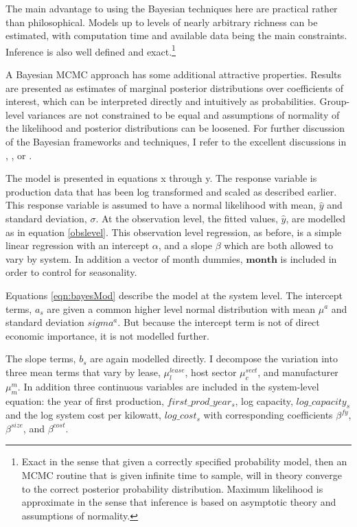 \documentclass[12pt]{article}
\begin{document}
The main advantage to using the Bayesian techniques here are practical rather than philosophical. Models up to levels of nearly arbitrary richness can be estimated, with computation time and available data being the main constraints. Inference is also well defined and exact.\footnote{Exact in the sense that given a correctly specified probability model, then an MCMC routine that is given infinite time to sample, will in theory converge to the correct posterior probability distribution. Maximum likelihood is approximate in the sense that inference is based on asymptotic theory and assumptions of normality.}

A Bayesian MCMC approach has some additional attractive properties. Results are presented as estimates of marginal posterior distributions over coefficients of interest, which can be interpreted directly and intuitively as probabilities. Group-level variances are not constrained to be equal and assumptions of normality of the likelihood and posterior distributions can be loosened. For further discussion of the Bayesian frameworks and techniques, I refer to the excellent discussions in \citet{gelman_bayesian_2013}, \citet{kruschke_doing_2014}, or \citet{mcelreath_statistical_2015}.

The model is presented in equations x through y. The response variable is production data that has been log transformed and scaled as described earlier. This response variable is assumed to have a normal likelihood with mean, $\hat{y}$ and standard deviation, $\sigma$. At the observation level, the fitted values, $\hat{y}$, are modelled as in equation \ref{obslevel}. This observation level regression, as before, is a simple linear regression with an intercept $\alpha$, and a slope $\beta$ which are both allowed to vary by system. In addition a vector of month dummies, $\mathbf{month}$ is included in order to control for seasonality.

Equations \ref{eqn:bayesMod} describe the model at the system level. The intercept terms, $a_s$ are given a common higher level normal distribution with mean $\mu^a$ and standard deviation $sigma^a$. But because the intercept term is not of direct economic importance, it is not modelled further.

The slope terms, $b_s$ are again modelled directly. I decompose the variation into three mean terms that vary by lease, $\mu^{lease}_l$, host sector $\mu^{sect}_c$, and manufacturer $\mu^m_m$. In addition three continuous variables are included in the system-level equation: the year of first production, $first\_prod\_year_s$, log capacity, $log\_capacity_s$ and the log system cost per kilowatt, $log\_cost_s$ with corresponding coefficients $\beta^{fy}$, $\beta^{size}$, and $\beta^{cost}$.
\end{document}
